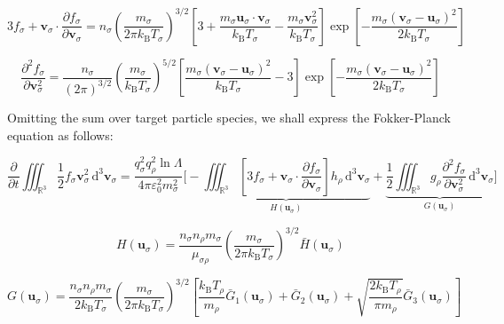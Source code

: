 \begin{equation}
    3f_\sigma+\mathbf{v}_\sigma\cdot\frac{\partial f_\sigma}{\partial\mathbf{v}_\sigma}=n_\sigma\left(\frac{m_\sigma}{2\pi k_\mathrm{B}T_\sigma}\right)^{3/2}\left[3+\frac{m_\sigma\mathbf{u}_\sigma\cdot\mathbf{v}_\sigma}{k_\mathrm{B}T_\sigma}-\frac{m_\sigma\mathbf{v}_\sigma^2}{k_\mathrm{B}T_\sigma}\right]\exp{\left[-\frac{m_\sigma(\mathbf{v}_\sigma-\mathbf{u}_\sigma)^2}{2k_\mathrm{B}T_\sigma}\right]}
\end{equation}

\begin{equation}
    \frac{\partial^2f_\sigma}{\partial\mathbf{v}_\sigma^2}=\frac{n_\sigma}{(2\pi)^{3/2}}\left(\frac{m_\sigma}{k_\mathrm{B}T_\sigma}\right)^{5/2}\left[\frac{m_\sigma(\mathbf{v}_\sigma-\mathbf{u}_\sigma)^2}{k_\mathrm{B}T_\sigma}-3\right]\exp{\left[-\frac{m_\sigma(\mathbf{v}_\sigma-\mathbf{u}_\sigma)^2}{2k_\mathrm{B}T_\sigma}\right]}
\end{equation}

Omitting the sum over target particle species, we shall express the Fokker-Planck equation as follows:

\begin{equation}
    \frac{\partial}{\partial t}\iiint_{\mathbb{R}^3}\frac{1}{2}f_\sigma\mathbf{v}_\sigma^2\,\mathrm{d}^3\mathbf{v}_\sigma=\frac{q_\sigma^2q_\rho^2\ln{\Lambda}}{4\pi\varepsilon_0^2m_\sigma^2}\Bigg[-\underbrace{\iiint_{\mathbb{R}^3}\left[3f_\sigma+\mathbf{v}_\sigma\cdot\frac{\partial f_\sigma}{\partial\mathbf{v}_\sigma}\right]h_\rho\,\mathrm{d}^3\mathbf{v}_\sigma}_{H(\mathbf{u}_\sigma)}+\underbrace{\frac{1}{2}\iiint_{\mathbb{R}^3}g_\rho\frac{\partial^2f_\sigma}{\partial\mathbf{v}_\sigma^2}\,\mathrm{d}^3\mathbf{v}_\sigma}_{G(\mathbf{u}_\sigma)}\Bigg]
\end{equation}

\begin{equation}
    H(\mathbf{u}_\sigma)=\frac{n_\sigma n_\rho m_\sigma}{\mu_{\sigma\rho}}\left(\frac{m_\sigma}{2\pi k_\mathrm{B}T_\sigma}\right)^{3/2}\bar{H}(\mathbf{u}_\sigma)
\end{equation}

\begin{equation}
    G(\mathbf{u}_\sigma)=\frac{n_\sigma n_\rho m_\sigma}{2k_\mathrm{B}T_\sigma}\left(\frac{m_\sigma}{2\pi k_\mathrm{B}T_\sigma}\right)^{3/2}\left[\frac{k_\mathrm{B}T_\rho}{m_\rho}\bar{G}_1(\mathbf{u}_\sigma)+\bar{G}_2(\mathbf{u}_\sigma)+\sqrt{\frac{2k_\mathrm{B}T_\rho}{\pi m_\rho}}\bar{G}_3(\mathbf{u}_\sigma)\right]
\end{equation}

